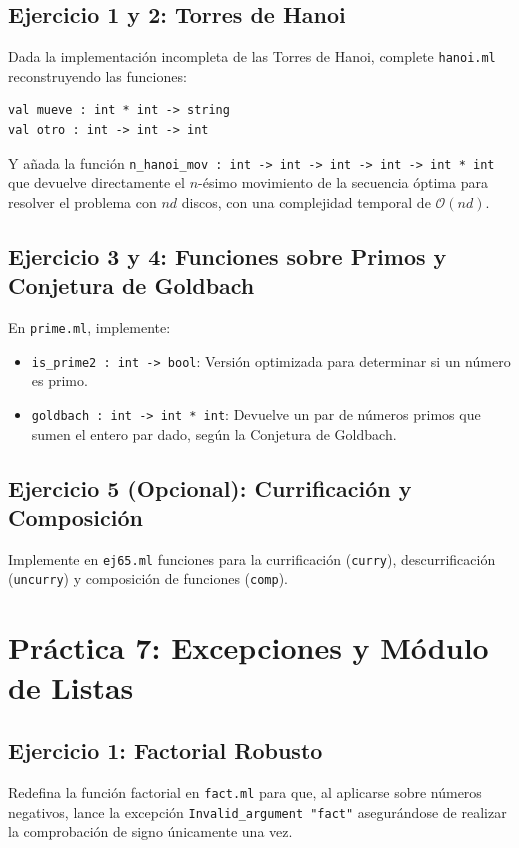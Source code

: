 \documentclass[11pt,a4paper]{article}
\begin{document}
\subsection{Ejercicio 1 y 2: Torres de Hanoi}
Dada la implementación incompleta de las Torres de Hanoi, complete \texttt{hanoi.ml} reconstruyendo las funciones:
\begin{lstlisting}
val mueve : int * int -> string
val otro : int -> int -> int
\end{lstlisting}
Y añada la función \texttt{n\_hanoi\_mov : int -> int -> int -> int -> int * int} que devuelve directamente el $n$-ésimo movimiento de la secuencia óptima para resolver el problema con $nd$ discos, con una complejidad temporal de $\mathcal{O}(nd)$.

\subsection{Ejercicio 3 y 4: Funciones sobre Primos y Conjetura de Goldbach}
En \texttt{prime.ml}, implemente:
\begin{itemize}
    \item \texttt{is\_prime2 : int -> bool}: Versión optimizada para determinar si un número es primo.
    \item \texttt{goldbach : int -> int * int}: Devuelve un par de números primos que sumen el entero par dado, según la Conjetura de Goldbach.
\end{itemize}

\subsection{Ejercicio 5 (Opcional): Currificación y Composición}
Implemente en \texttt{ej65.ml} funciones para la currificación (\texttt{curry}), descurrificación (\texttt{uncurry}) y composición de funciones (\texttt{comp}).


\section{Práctica 7: Excepciones y Módulo de Listas}
\subsection{Ejercicio 1: Factorial Robusto}
Redefina la función factorial en \texttt{fact.ml} para que, al aplicarse sobre números negativos, lance la excepción \texttt{Invalid\_argument "fact"} asegurándose de realizar la comprobación de signo únicamente una vez.
\end{document}
